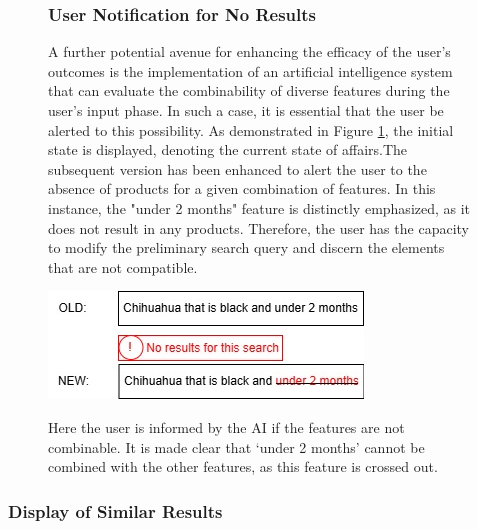 \documentclass[../../submission.tex]{subfiles}
\begin{document}
 \begin{figure}[h]
    \centering
    \begin{minipage}{0.35\textwidth}
        \subsubsection{User Notification for No Results}
        A further potential avenue for enhancing the efficacy of the user's 
        outcomes is the implementation of an artificial intelligence system that can 
        evaluate the combinability of diverse features during the user's input phase. 
        In such a case, it is essential that the user be alerted to this possibility. 
        As demonstrated in Figure \ref{fig:no_result}, the initial state is displayed, denoting the current 
        state of affairs.The subsequent version has been enhanced to alert the user to the 
        absence of products for a given combination of features. In this instance, the 
        "under 2 months" feature is distinctly emphasized, as it does not result in any products. 
        Therefore, the user has the capacity to modify the preliminary search query and discern the 
        elements that are not compatible. 
    \end{minipage}
    \hfill
    \begin{minipage}{0.55\textwidth}
        
        \includegraphics[width=\textwidth]{images/keine_ergebnisse}
        \caption{Here the user is informed by the AI if the features are not combinable. It is made clear that ‘under 2 months’ cannot be combined with the other features, as this feature is crossed out.}
        \Description{}
        \label{fig:no_result}
    \end{minipage}
\end{figure}

\subsubsection{Display of Similar Results}   
\end{document}
